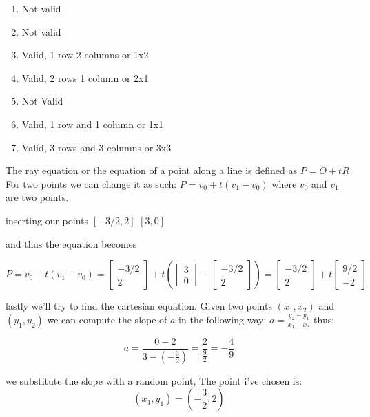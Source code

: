 \begin{enumerate}
\item Not valid
\item Not valid
\item Valid, 1 row 2 columns or 1x2
\item Valid, 2 rows 1 column or 2x1
\item Not Valid
\item Valid, 1 row and 1 column or 1x1
\item Valid, 3 rows and 3 columns or 3x3
\end{enumerate}







The ray equation or the equation of a point along a line is defined as $P=O+tR$ For two points we can change it as such:
$P=v_0 + t(v_1 - v_0)$ where $v_0$ and $v_1$ are two points.

inserting our points
$[-3/2,2]$
$[3,0]$

and thus the equation becomes

$P=v_0 + t(v_1 - v_0) = \begin{bmatrix} -3/2 \\ 2\end{bmatrix} + t\left(\begin{bmatrix} 3 \\ 0\end{bmatrix} - \begin{bmatrix} -3/2 \\ 2\end{bmatrix}\right) = \begin{bmatrix} -3/2 \\ 2\end{bmatrix} + t\begin{bmatrix} 9/2 \\ -2\end{bmatrix}$

lastly we'll try to find the cartesian equation.  Given two points $(x_1, x_2)$ and $(y_1, y_2)$ we can compute the slope of $a$ in the following way: $a = \frac{y_2 - y_1}{x_1 - x_2}$
thus:

\begin{equation}
a = \frac{0 - 2}{ 3 - (-\frac{3}{2})} = \frac{2}{\frac{9}{2}} = - \frac{4}{9}
\end{equation}

we substitute the slope with a random point,
The point i've chosen is:
\[
(x_1, y_1) = \left ( -\frac{3}{2}, 2 \right )
\]

